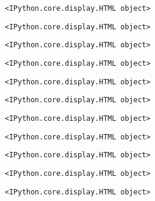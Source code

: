 \documentclass[11pt]{article}
\begin{document}
    
    \begin{verbatim}
<IPython.core.display.HTML object>
    \end{verbatim}

    
    
    \begin{verbatim}
<IPython.core.display.HTML object>
    \end{verbatim}

    
    
    \begin{verbatim}
<IPython.core.display.HTML object>
    \end{verbatim}

    
    
    \begin{verbatim}
<IPython.core.display.HTML object>
    \end{verbatim}

    
    
    \begin{verbatim}
<IPython.core.display.HTML object>
    \end{verbatim}

    
    
    \begin{verbatim}
<IPython.core.display.HTML object>
    \end{verbatim}

    
    
    \begin{verbatim}
<IPython.core.display.HTML object>
    \end{verbatim}

    
    
    \begin{verbatim}
<IPython.core.display.HTML object>
    \end{verbatim}

    
    
    \begin{verbatim}
<IPython.core.display.HTML object>
    \end{verbatim}

    
    
    \begin{verbatim}
<IPython.core.display.HTML object>
    \end{verbatim}

    
    
    \begin{verbatim}
<IPython.core.display.HTML object>
    \end{verbatim}
\end{document}
